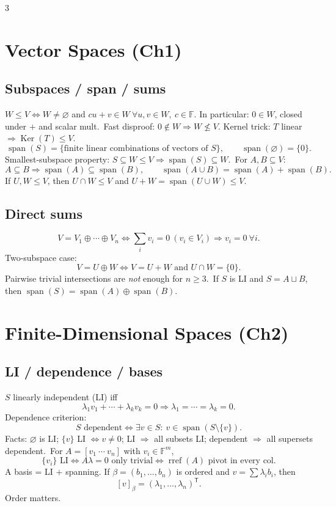 \documentclass[10pt]{article}
\newcommand{\F}{\mathbb{F}}
\newcommand{\Ker}{\operatorname{Ker}}
\newcommand{\spann}{\operatorname{span}}
\begin{document}
\begin{multicols}{3}
\scriptsize
\raggedcolumns

\section*{Vector Spaces (Ch1)}

\subsection*{Subspaces / span / sums}
$W\le V\iff W\neq\varnothing$ and $cu+v\in W\ \forall u,v\in W,\ c\in\F$. In particular: $0\in W$, closed under $+$ and scalar mult.\
Fast disproof: $0\notin W\Rightarrow W\not\le V$. Kernel trick: $T$ linear $\Rightarrow \Ker(T)\le V$.\
\[
\spann(S)=\{\text{finite linear combinations of vectors of }S\},\qquad \spann(\varnothing)=\{0\}.
\]
Smallest-subspace property: $S\subseteq W\le V\Rightarrow \spann(S)\subseteq W$.\
For $A,B\subseteq V$:
\[
A\subseteq B\Rightarrow \spann(A)\subseteq\spann(B),\qquad
\spann(A\cup B)=\spann(A)+\spann(B).
\]
If $U,W\le V$, then $U\cap W\le V$ and $U+W=\spann(U\cup W)\le V$.

\subsection*{Direct sums}
\[
V=V_1\oplus\cdots\oplus V_n
\iff
\sum_i v_i=0\ (v_i\in V_i)\Rightarrow v_i=0\ \forall i.
\]
Two-subspace case:
\[
V=U\oplus W\iff V=U+W\text{ and }U\cap W=\{0\}.
\]
Pairwise trivial intersections are \emph{not} enough for $n\ge 3$.\
If $S$ is LI and $S=A\sqcup B$, then $\spann(S)=\spann(A)\oplus\spann(B)$.

\section*{Finite-Dimensional Spaces (Ch2)}

\subsection*{LI / dependence / bases}
$S$ linearly independent (LI) iff
\[
\lambda_1v_1+\cdots+\lambda_kv_k=0\Rightarrow \lambda_1=\cdots=\lambda_k=0.
\]
Dependence criterion:
\[
S\text{ dependent}\iff \exists v\in S:\ v\in\spann(S\setminus\{v\}).
\]
Facts: $\varnothing$ is LI; $\{v\}$ LI $\iff v\neq 0$; LI $\Rightarrow$ all subsets LI; dependent $\Rightarrow$ all supersets dependent.\
For $A=[v_1\ \cdots\ v_n]$ with $v_i\in\F^m$,
\[
\{v_i\}\text{ LI}\iff A\lambda=0\text{ only trivial}\iff \operatorname{rref}(A)\text{ pivot in every col}.
\]
A basis = LI $+$ spanning. If $\beta=(b_1,\dots,b_n)$ is ordered and $v=\sum\lambda_i b_i$, then
\[
[v]_\beta=(\lambda_1,\dots,\lambda_n)^{\mathsf T}.
\]
Order matters.


\end{multicols}
\end{document}
